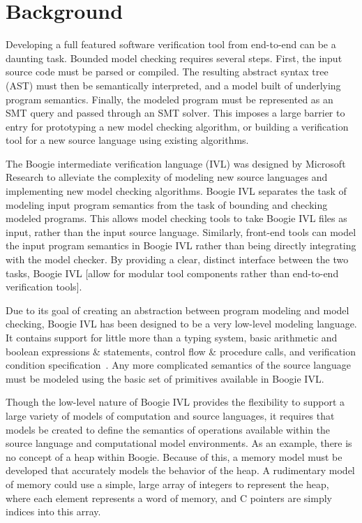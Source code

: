 \chapter{Background}\label{ch:background}
Developing a full featured software verification tool from end-to-end
can be a daunting task.  Bounded model checking requires several
steps.  First, the input source code must be parsed or compiled.  The
resulting abstract syntax tree (AST) must then be semantically
interpreted, and a model built of underlying program semantics.
Finally, the modeled program must be represented as an SMT query and
passed through an SMT solver.  This imposes a large barrier to entry
for prototyping a new model checking algorithm, or building a
verification tool for a new source language using existing
algorithms. 

The Boogie intermediate verification language (IVL) was designed by
Microsoft Research to alleviate the complexity of modeling new source
languages and implementing new model checking algorithms.  Boogie IVL
separates the task of modeling input program semantics from the task
of bounding and checking modeled programs.  This allows model checking
tools to take Boogie IVL files as input, rather than the input source
language.  Similarly, front-end tools can model the input program
semantics in Boogie IVL rather than being directly integrating with
the model checker.  By providing a clear, distinct interface between
the two tasks, Boogie IVL [allow for modular tool components rather
than end-to-end verification tools]. 

Due to its goal of creating an abstraction between program modeling
and model checking, Boogie IVL has been designed to be a very
low-level modeling language.  It contains support for little more than
a typing system, basic arithmetic and boolean expressions \&
statements, control flow \& procedure calls, and verification
condition specification~\cite{boogie}.  Any more complicated semantics
of the source language must be modeled using the basic set of
primitives available in Boogie IVL. 

Though the low-level nature of Boogie IVL provides the flexibility to
support a large variety of models of computation and source languages,
it requires that models be created to define the semantics of
operations available within the source language and computational
model environments.  As an example, there is no concept of a heap
within Boogie.  Because of this, a memory model must be developed that
accurately models the behavior of the heap.  A rudimentary model of
memory could use a simple, large array of integers to represent the
heap, where each element represents a word of memory, and C pointers
are simply indices into this array. 


